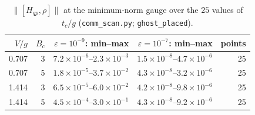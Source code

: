 \begin{table}[h]
\centering\small
\begin{tabular}{r r r r r}
\toprule
$V/g$ & $B_c$ & $\varepsilon=10^{-9}$: min--max & $\varepsilon=10^{-7}$: min--max & points\\
\midrule
0.707 & 3 & $7.2\times10^{-6}$--$2.3\times10^{-3}$ & $1.5\times10^{-8}$--$4.7\times10^{-6}$ & 25\\
0.707 & 5 & $1.8\times10^{-5}$--$3.7\times10^{-2}$ & $4.3\times10^{-8}$--$3.2\times10^{-6}$ & 25\\
1.414 & 3 & $6.5\times10^{-5}$--$6.0\times10^{-2}$ & $4.2\times10^{-8}$--$9.8\times10^{-6}$ & 25\\
1.414 & 5 & $4.5\times10^{-4}$--$3.0\times10^{-1}$ & $4.3\times10^{-8}$--$9.2\times10^{-6}$ & 25\\
\bottomrule
\end{tabular}
\caption{$\|[H_{qp},\rho]\|$ at the minimum-norm gauge over the $25$ values of $t_c/g$ (\texttt{comm\_scan.py}; \texttt{ghost\_placed}).}
\label{tab:comm}
\end{table}
